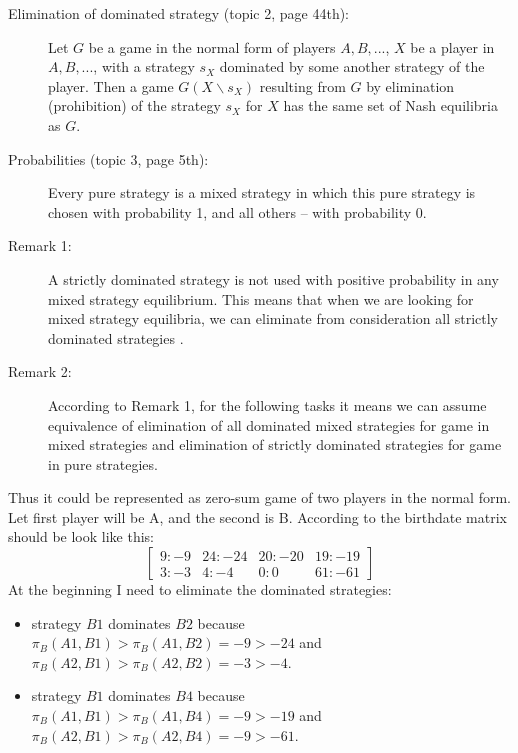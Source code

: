\documentclass[
	a4paper, %
	11pt, %
]{CSUniSchoolLabReport}
\begin{document}
\begin{description}
    \item[Elimination of dominated strategy (topic 2, page 44th):] Let $G$ be a game in the normal form of players $A, B, ...$, $X$ be a player in $A, B, ...$, with a strategy $s_X$ dominated by some another strategy of the player. Then a game $G(X\backslash s_X)$ resulting from $G$ by elimination (prohibition) of the strategy $s_X$ for $X$ has the same set of Nash equilibria as $G$.
    \item[Probabilities (topic 3, page 5th):] Every pure strategy is a mixed strategy in which this pure strategy is chosen with probability 1, and all others – with probability 0.
    \item[Remark 1:] A strictly dominated strategy is not used with positive probability in any mixed strategy equilibrium. This means that when we are looking for mixed strategy equilibria, we can eliminate from consideration all strictly dominated strategies \autocite{branislav}.
    \item[Remark 2:] According to Remark 1, for the following tasks it means we can assume equivalence of elimination of all dominated mixed strategies for game in mixed strategies and elimination of strictly dominated strategies for game in pure strategies.
\end{description}\hspace{2pt}

Thus it could be represented as zero-sum game of two players in the normal form. Let first player will be A, and the second is B.
According to the birthdate matrix should be look like this:
$$
\begin{bmatrix}
    9:-9 & 24:-24 & 20:-20 & 19:-19 \\
    3:-3 & 4:-4 & 0:0 & 61:-61
\end{bmatrix}
$$
At the beginning I need to eliminate the dominated strategies:\\
\begin{itemize}
    \item strategy $B1$ dominates $B2$ because $\pi_B(A1, B1) > \pi_B(A1, B2) = -9 > -24$ and $\pi_B(A2, B1) > \pi_B(A2, B2) = -3 > -4$.
    \item strategy $B1$ dominates $B4$ because $\pi_B(A1, B1) > \pi_B(A1, B4) = -9 > -19$ and $\pi_B(A2, B1) > \pi_B(A2, B4) = -9 > -61$.
\end{itemize}\hspace{2pt}
\end{document}
